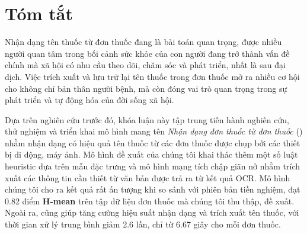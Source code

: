 \chapter*{Tóm tắt}
\label{abstract}

Nhận dạng tên thuốc từ đơn thuốc đang là bài toán quan trọng, được nhiều người quan tâm trong bối cảnh sức khỏe của con người đang trở thành vấn đề chính mà xã hội có nhu cầu theo dõi, chăm sóc và phát triển, nhất là sau đại dịch. Việc trích xuất và lưu trữ lại tên thuốc trong đơn thuốc mở ra nhiều cơ hội cho không chỉ bản thân người bệnh, mà còn đóng vai trò quan trọng trong sự phát triển và tự động hóa của đời sống xã hội.

Dựa trên nghiên cứu trước đó, khóa luận này tập trung tiến hành nghiên cứu, thử nghiệm và triển khai mô hình mang tên \textit{Nhận dạng đơn thuốc từ đơn thuốc} () nhằm nhận dạng có hiệu quả tên thuốc từ các đơn thuốc được chụp bởi các thiết bị di động, máy ảnh. Mô hình đề xuất của chúng tôi khai thác thêm một số luật heuristic dựa trên mẫu đặc trưng và mô hình mạng tích chập giãn nở nhằm trích xuất các thông tin cần thiết từ văn bản được trả ra từ kết quả OCR. Mô hình chúng tôi cho ra kết quả rất ấn tượng khi so sánh với phiên bản tiền nghiệm, đạt 0.82 điểm \textbf{H-mean} trên tập dữ liệu đơn thuốc mà chúng tôi thu thập, đề xuất. Ngoài ra,  cũng giúp tăng cường hiệu suất nhận dạng và trích xuất tên thuốc, với thời gian xử lý trung bình giảm 2.6 lần, chỉ từ 6.67 giây cho mỗi đơn thuốc.
